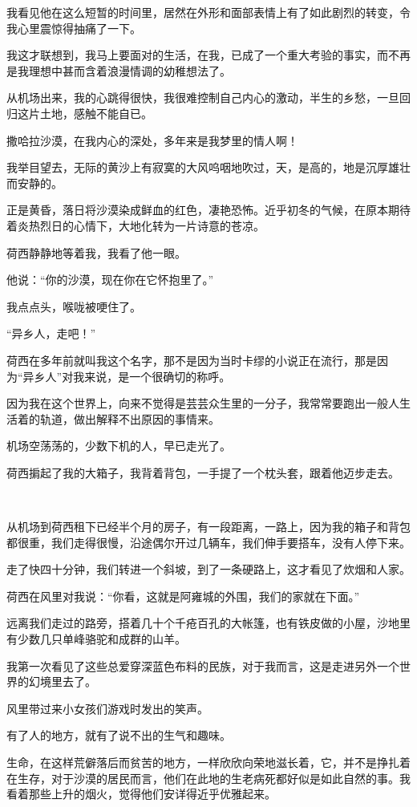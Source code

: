 \par 我看见他在这么短暂的时间里，居然在外形和面部表情上有了如此剧烈的转变，令我心里震惊得抽痛了一下。
\par 我这才联想到，我马上要面对的生活，在我，已成了一个重大考验的事实，而不再是我理想中甚而含着浪漫情调的幼稚想法了。
\par 从机场出来，我的心跳得很快，我很难控制自己内心的激动，半生的乡愁，一旦回归这片土地，感触不能自已。
\par 撒哈拉沙漠，在我内心的深处，多年来是我梦里的情人啊！
\par 我举目望去，无际的黄沙上有寂寞的大风呜咽地吹过，天，是高的，地是沉厚雄壮而安静的。
\par 正是黄昏，落日将沙漠染成鲜血的红色，凄艳恐怖。近乎初冬的气候，在原本期待着炎热烈日的心情下，大地化转为一片诗意的苍凉。
\par 荷西静静地等着我，我看了他一眼。
\par 他说：“你的沙漠，现在你在它怀抱里了。”
\par 我点点头，喉咙被哽住了。
\par “异乡人，走吧！”
\par 荷西在多年前就叫我这个名字，那不是因为当时卡缪的小说正在流行，那是因为“异乡人”对我来说，是一个很确切的称呼。
\par 因为我在这个世界上，向来不觉得是芸芸众生里的一分子，我常常要跑出一般人生活着的轨道，做出解释不出原因的事情来。
\par 机场空荡荡的，少数下机的人，早已走光了。
\par 荷西掮起了我的大箱子，我背着背包，一手提了一个枕头套，跟着他迈步走去。
\par  
\par 从机场到荷西租下已经半个月的房子，有一段距离，一路上，因为我的箱子和背包都很重，我们走得很慢，沿途偶尔开过几辆车，我们伸手要搭车，没有人停下来。
\par 走了快四十分钟，我们转进一个斜坡，到了一条硬路上，这才看见了炊烟和人家。
\par 荷西在风里对我说：“你看，这就是阿雍城的外围，我们的家就在下面。”
\par 远离我们走过的路旁，搭着几十个千疮百孔的大帐篷，也有铁皮做的小屋，沙地里有少数几只单峰骆驼和成群的山羊。
\par 我第一次看见了这些总爱穿深蓝色布料的民族，对于我而言，这是走进另外一个世界的幻境里去了。
\par 风里带过来小女孩们游戏时发出的笑声。
\par 有了人的地方，就有了说不出的生气和趣味。
\par 生命，在这样荒僻落后而贫苦的地方，一样欣欣向荣地滋长着，它，并不是挣扎着在生存，对于沙漠的居民而言，他们在此地的生老病死都好似是如此自然的事。我看着那些上升的烟火，觉得他们安详得近乎优雅起来。
